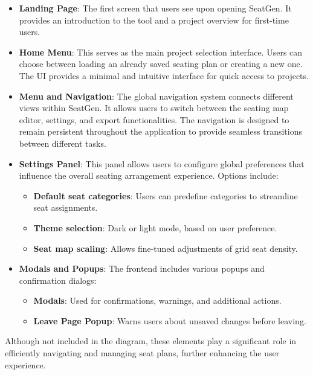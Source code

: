 \begin{itemize}
    \item \textbf{Landing Page}: The first screen that users see upon opening SeatGen. It provides an introduction to the tool and a project overview for first-time users.
    
    \item \textbf{Home Menu}: This serves as the main project selection interface. Users can choose between loading an already saved seating plan or creating a new one. The UI provides a minimal and intuitive interface for quick access to projects.
    
    \item \textbf{Menu and Navigation}: The global navigation system connects different views within SeatGen. It allows users to switch between the seating map editor, settings, and export functionalities. The navigation is designed to remain persistent throughout the application to provide seamless transitions between different tasks.
    
    \item \textbf{Settings Panel}: This panel allows users to configure global preferences that influence the overall seating arrangement experience. Options include:
    \begin{itemize}
        \item \textbf{Default seat categories}: Users can predefine categories to streamline seat assignments.
        \item \textbf{Theme selection}: Dark or light mode, based on user preference.
        \item \textbf{Seat map scaling}: Allows fine-tuned adjustments of grid seat density.
    \end{itemize}
    
    \item \textbf{Modals and Popups}: The frontend includes various popups and confirmation dialogs:
    \begin{itemize}
        \item \textbf{Modals}: Used for confirmations, warnings, and additional actions.
        \item \textbf{Leave Page Popup}: Warns users about unsaved changes before leaving.
    \end{itemize}
\end{itemize}

Although not included in the diagram, these elements play a significant role in efficiently navigating and managing seat plans, further enhancing the user experience.


